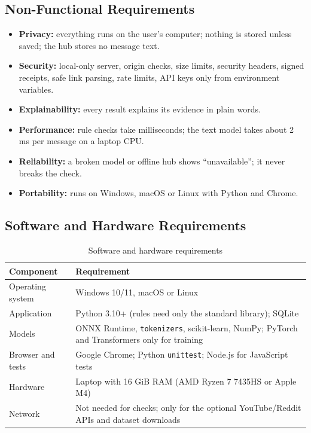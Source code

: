 \subsection{Non-Functional Requirements}
\begin{itemize}
\item \textbf{Privacy:} everything runs on the user's computer; nothing is stored unless saved; the hub stores no message text.
\item \textbf{Security:} local-only server, origin checks, size limits, security headers, signed receipts, safe link parsing, rate limits, API keys only from environment variables.
\item \textbf{Explainability:} every result explains its evidence in plain words.
\item \textbf{Performance:} rule checks take milliseconds; the text model takes about 2 ms per message on a laptop CPU.
\item \textbf{Reliability:} a broken model or offline hub shows ``unavailable''; it never breaks the check.
\item \textbf{Portability:} runs on Windows, macOS or Linux with Python and Chrome.
\end{itemize}

\subsection{Software and Hardware Requirements}
\begin{table}[H]
\centering
\small
\renewcommand{\arraystretch}{1.2}
\caption{Software and hardware requirements}
\label{tab:swhw}
\begin{tabular}{|>{\raggedright\arraybackslash}p{3.5cm}|>{\raggedright\arraybackslash}p{11.3cm}|}
\hline
\textbf{Component} & \textbf{Requirement} \\ \hline
Operating system & Windows 10/11, macOS or Linux \\ \hline
Application & Python 3.10+ (rules need only the standard library); SQLite \\ \hline
Models & ONNX Runtime, \texttt{tokenizers}, scikit-learn, NumPy; PyTorch and Transformers only for training \\ \hline
Browser and tests & Google Chrome; Python \texttt{unittest}; Node.js for JavaScript tests \\ \hline
Hardware & Laptop with 16 GiB RAM (AMD Ryzen 7 7435HS or Apple M4) \\ \hline
Network & Not needed for checks; only for the optional YouTube/Reddit APIs and dataset downloads \\ \hline
\end{tabular}
\end{table}

